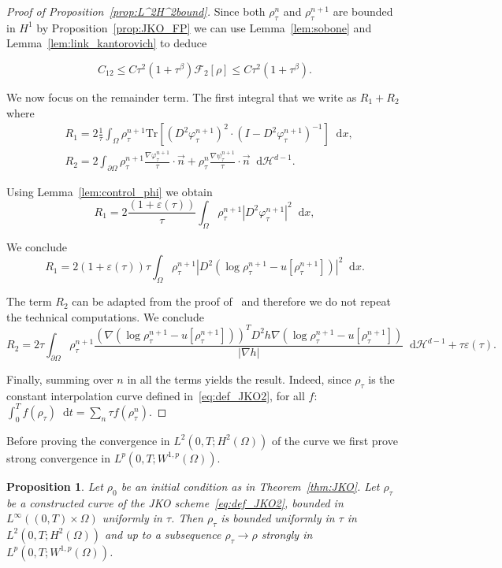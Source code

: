 \documentclass[a4paper,twosided, 11pt]{article}
\renewcommand{\color}[2][]{}
\newcommand{\eps}{\varepsilon}
\newcommand {\f}   {\frac}
\newcommand {\p}   {\partial}
\theoremstyle{plain}
\newtheorem{proposition}[thm]{Proposition}
\theoremstyle{remark}
\newcommand{\diff}{\mathop{}\!\mathrm{d}}
\numberwithin{equation}{section}
\begin{document}
\begin{proof}[Proof of Proposition~\ref{prop:L^2H^2bound}]
Since both $\rho_{\tau}^{n}$ and $\rho_{\tau}^{n+1}$ are bounded in $H^1$ by Proposition~\ref{prop:JKO_FP} we can use Lemma~\ref{lem:sobone} and Lemma~\ref{lem:link_kantorovich} to deduce

$$
C_{12}\le C\tau^2 (1+\tau^\beta)\mathcal{F}_{2}[\rho]\le C\tau^2(1+\tau^{\beta}).
$$

We now focus on the remainder term. The first integral that we write as $R_1+ R_2$ where
\begin{align*}
& R_1 = 2\f{1}{\tau}\int_{\Omega}\rho_{\tau}^{n+1} \mathrm{Tr}[(D^2\varphi_{\tau}^{n+1})^2 \cdot(I-D^2\varphi_{\tau}^{n+1})^{-1}]\diff x, \\
& R_2 = 2\int_{\p\Omega}\rho_{\tau}^{n+1} \f{\nabla\varphi_{\tau}^{n+1}}{\tau}\cdot \vec{n} +  \rho_{\tau}^{n} \f{\nabla\psi_{\tau}^{n+1}}{\tau}\cdot\vec{n}\diff \mathcal{H}^{d-1}. 
\end{align*}


Using Lemma~\ref{lem:control_phi} we obtain
$$
R_1= 2\f{(1+\eps(\tau))}{\tau} \int_{\Omega} \rho_{\tau}^{n+1} |D^2\varphi_{\tau}^{n+1}|^2\diff x,
$$

We conclude
$$
R_1= 2(1+\eps(\tau))\tau \int_{\Omega} \rho_{\tau}^{n+1} |D^2(\log\rho_{\tau}^{n+1} - u[\rho_{\tau}^{n+1}])|^2\diff x. 
$$

The term $R_2$ can be adapted from the proof of~\cite[Theorem 6.3]{toshpulatov} and therefore we do not repeat the technical computations. We conclude
$$
R_2 = 2\tau\int_{\p\Omega}\rho_{\tau}^{n+1} \f{(\nabla (\log \rho_{\tau}^{n+1} - u[\rho_{\tau}^{n+1} ]))^{T} D^{2} h \nabla (\log \rho_{\tau}^{n+1} - u[\rho_{\tau}^{n+1} ])}{|\nabla h|}\diff \mathcal{H}^{d-1} + \tau\eps(\tau).
$$

Finally, summing over $n$ in all the terms yields the result. Indeed, since $\rho_{\tau}$ is the constant interpolation curve {\color{blue} defined in~\eqref{eq:def_JKO2}}, for all $f$: $\int_{0}^{T}f(\rho_{\tau})\diff t = \sum_{n}\tau f(\rho_{\tau}^{n}).$

\end{proof}

Before proving the convergence in $L^2(0,T;H^2(\Omega))$ of the curve we first prove strong convergence in $L^{p}(0,T; W^{1,p}(\Omega))$. 
\begin{proposition}\label{prop:first_convergence_JKO}
    {\color{blue}Let $\rho_{0}$ be an initial condition as in Theorem~\ref{thm:JKO}. Let $\rho_{\tau}$ be a constructed curve of the JKO scheme~\eqref{eq:def_JKO2}, bounded in $L^{\infty}((0,T)\times\Omega)$ uniformly in $\tau$}. Then $\rho_{\tau}$ is bounded uniformly in $\tau$ in $L^{2}(0,T; H^{2}(\Omega))$ and {\color{blue} up to a subsequence} $\rho_{\tau}\to \rho$ strongly  in $L^{p}(0,T; W^{1,p}(\Omega)) $.
\end{proposition}
\end{document}

